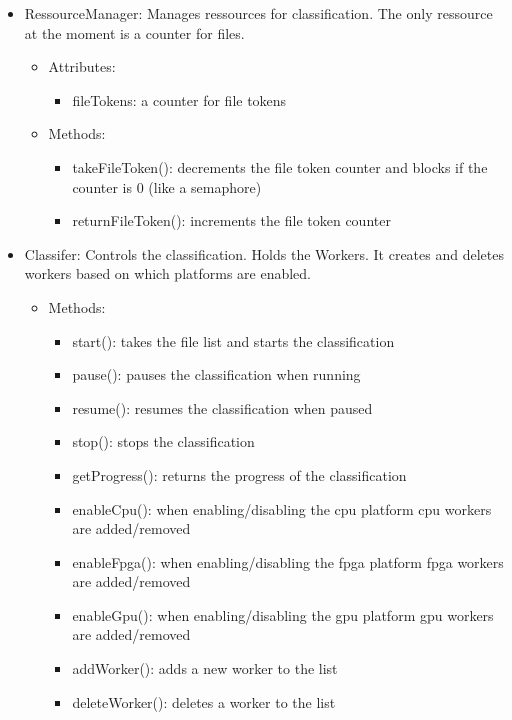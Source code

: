 \documentclass[parskip=full]{scrartcl}
\begin{document}
\begin{itemize}
	\item RessourceManager: Manages ressources for classification. The only ressource at the moment is a counter for files.
	\begin{itemize}
		\item Attributes:
		\begin{itemize}
			\item fileTokens: a counter for file tokens
		\end{itemize}
		\item Methods:
		\begin{itemize}
			\item takeFileToken(): decrements the file token counter and blocks if the counter is 0 (like a semaphore)
			\item returnFileToken(): increments the file token counter
		\end{itemize}
	\end{itemize}
	\item Classifer: Controls the classification. Holds the Workers. It creates and deletes workers based on which platforms are enabled.
	\begin{itemize}
		\item Methods:
		\begin{itemize}
			\item start(): takes the file list and starts the classification
			\item pause(): pauses the classification when running
			\item resume(): resumes the classification when paused
			\item stop(): stops the classification
			\item getProgress(): returns the progress of the classification
			\item enableCpu(): when enabling/disabling the cpu platform cpu  workers are added/removed
			\item enableFpga(): when enabling/disabling the fpga platform fpga  workers are added/removed
			\item enableGpu(): when enabling/disabling the gpu platform gpu  workers are added/removed
			\item addWorker(): adds a new worker to the list
			\item deleteWorker():  deletes a worker to the list
		\end{itemize}
	\end{itemize}
\end{itemize}
\end{document}
